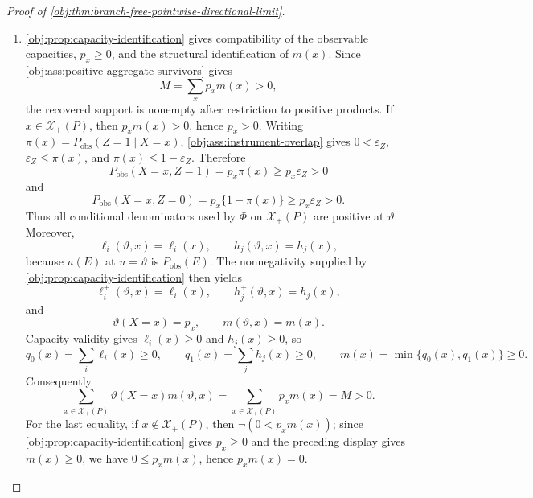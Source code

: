 \begin{proof}[Proof of \cref{obj:thm:branch-free-pointwise-directional-limit}]
\begin{enumerate}
\item \cref{obj:prop:capacity-identification} gives compatibility of the observable capacities, \(p_x\ge0\), and the structural identification of \(m(x)\). Since \cref{obj:ass:positive-aggregate-survivors} gives
\[
M=\sum_x p_xm(x)>0,
\]
the recovered support is nonempty after restriction to positive products. If \(x\in\mathcal X_+(P)\), then \(p_xm(x)>0\), hence \(p_x>0\). Writing \(\pi(x)=P_{\mathrm{obs}}(Z=1\mid X=x)\), \cref{obj:ass:instrument-overlap} gives \(0<\varepsilon_Z\), \(\varepsilon_Z\le \pi(x)\), and \(\pi(x)\le 1-\varepsilon_Z\). Therefore
\[
P_{\mathrm{obs}}(X=x,Z=1)=p_x\pi(x)\ge p_x\varepsilon_Z>0
\]
and
\[
P_{\mathrm{obs}}(X=x,Z=0)=p_x\{1-\pi(x)\}\ge p_x\varepsilon_Z>0 .
\]
Thus all conditional denominators used by \(\Phi\) on \(\mathcal X_+(P)\) are positive at \(\vartheta\). Moreover,
\[
\ell_i(\vartheta,x)=\ell_i(x),\qquad h_j(\vartheta,x)=h_j(x),
\]
because \(u(E)\) at \(u=\vartheta\) is \(P_{\mathrm{obs}}(E)\). The nonnegativity supplied by \cref{obj:prop:capacity-identification} then yields
\[
\ell_i^+(\vartheta,x)=\ell_i(x),\qquad h_j^+(\vartheta,x)=h_j(x),
\]
and
\[
\vartheta(X=x)=p_x,\qquad m(\vartheta,x)=m(x).
\]
Capacity validity gives \(\ell_i(x)\ge0\) and \(h_j(x)\ge0\), so
\[
q_0(x)=\sum_i\ell_i(x)\ge0,
\qquad
q_1(x)=\sum_jh_j(x)\ge0,
\qquad
m(x)=\min\{q_0(x),q_1(x)\}\ge0 .
\]
Consequently
\[
\sum_{x\in\mathcal X_+(P)}\vartheta(X=x)m(\vartheta,x)
=
\sum_{x\in\mathcal X_+(P)}p_xm(x)
=
M>0 .
\]
For the last equality, if \(x\notin\mathcal X_+(P)\), then \(\neg(0<p_xm(x))\); since \cref{obj:prop:capacity-identification} gives \(p_x\ge0\) and the preceding display gives \(m(x)\ge0\), we have \(0\le p_xm(x)\), hence \(p_xm(x)=0\). %


\end{enumerate}
\end{proof}
